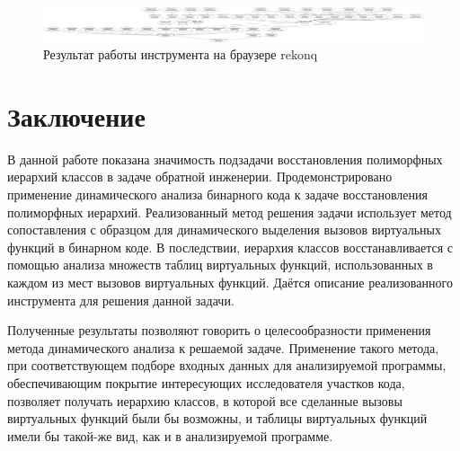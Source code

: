 \documentclass[a4paper,12pt,russian]{article}
\newcommand{\code}[1]{\textsf{#1}}
\begin{document}
\begin{figure}[b]
  \center
  \includegraphics[width=\textwidth]{rekonq-hier.png}
  \hfill
  \caption{Результат работы инструмента на браузере \code{rekonq}}
  \label{rekonq_res_fig}
\end{figure}

\clearpage
\newpage
\section{Заключение}
В данной работе показана значимость подзадачи восстановления полиморфных иерархий классов в задаче обратной инженерии.
Продемонстрировано применение динамического анализа бинарного кода к задаче восстановления полиморфных иерархий.
Реализованный метод решения задачи использует метод сопоставления с образцом для динамического выделения вызовов виртуальных функций в бинарном коде.
В последствии, иерархия классов восстанавливается с помощью анализа множеств таблиц виртуальных функций, использованных в каждом из мест вызовов виртуальных функций.
Даётся описание реализованного инструмента для решения данной задачи.

Полученные результаты позволяют говорить о целесообразности применения метода динамического анализа к решаемой задаче.
Применение такого метода, при соответствующем подборе входных данных для анализируемой программы, обеспечивающим покрытие интересующих исследователя участков кода, позволяет получать иерархию классов, в которой все сделанные вызовы виртуальных функций были бы возможны, и таблицы виртуальных функций имели бы такой-же вид, как и в анализируемой программе.

\clearpage
\end{document}
